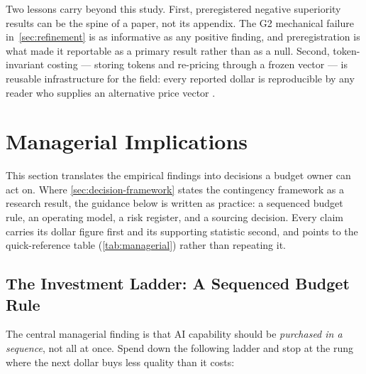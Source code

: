 \documentclass[12pt,a4paper]{article}
\begin{document}
Two lessons carry beyond this study. First, preregistered negative superiority
results can be the spine of a paper, not its appendix. The G2 mechanical failure
in~\cref{sec:refinement} is as informative as any positive finding, and
preregistration is what made it reportable as a primary result rather than as a
null. Second, token-invariant costing --- storing tokens and re-pricing through a
frozen vector --- is reusable infrastructure for the field: every reported dollar
is reproducible by any reader who supplies an alternative price vector
\citep{Diewert1976, SandveEtAl2013}.


\section{Managerial Implications}\label{sec:managerial}

This section translates the empirical findings into decisions a budget owner can
act on. Where \cref{sec:decision-framework} states the contingency framework as
a research result, the guidance below is written as practice: a sequenced budget
rule, an operating model, a risk register, and a sourcing decision. Every claim
carries its dollar figure first and its supporting statistic second, and points
to the quick-reference table (\cref{tab:managerial}) rather than repeating it.

\subsection{The Investment Ladder: A Sequenced Budget Rule}

The central managerial finding is that AI capability should be \emph{purchased in
a sequence}, not all at once. Spend down the following ladder and stop at the
rung where the next dollar buys less quality than it costs:
\end{document}
